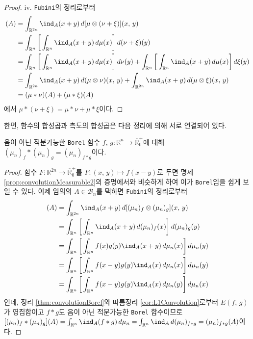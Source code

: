 \begin{proof}
    iv. \texttt{Fubini}의 정리로부터
    \begin{align*}
        [\mu*(\nu+\xi)](A)&=\int_{\mathbb{R}^{2n}}\ind_A(x+y)\,d[\mu\otimes(\nu+\xi)](x,\,y)\\
        &=\int_{\mathbb{R}^n}\bigg[\int_{\mathbb{R}^n}\ind_A(x+y)\,d\mu(x)\bigg]\,d(\nu+\xi)(y)\\
        &=\int_{\mathbb{R}^n}\bigg[\int_{\mathbb{R}^n}\ind_A(x+y)\,d\mu(x)\bigg]\,d\nu(y)+\int_{\mathbb{R}^n}\bigg[\int_{\mathbb{R}^n}\ind_A(x+y)\,d\mu(x)\bigg]\,d\xi(y)\\
        &=\int_{\mathbb{R}^{2n}}\ind_A(x+y)\,d(\mu\otimes\nu)(x,\,y)+\int_{\mathbb{R}^{2n}}\ind_A(x+y)\,d(\mu\otimes\xi)(x,\,y)\\
        &=(\mu*\nu)(A)+(\mu*\xi)(A)
    \end{align*}
    에서 $\mu*(\nu+\xi)=\mu*\nu+\mu*\xi$이다.
\end{proof}

한편, 함수의 합성곱과 측도의 합성곱은 다음 정리에 의해 서로 연결되어 있다.

\begin{theorem}
    음이 아닌 적분가능한 \texttt{Borel} 함수 $f,\,g:\mathbb{R}^n\to\overline{\mathbb{R}}^+_0$에 대해 $(\mu_n)_f*(\mu_n)_g=(\mu_n)_{f*g}$이다.
\end{theorem}

\begin{proof}
    함수 $F:\mathbb{R}^{2n}\to\overline{\mathbb{R}}^+_0$를 $F:(x,\,y)\mapsto f(x-y)$로 두면 명제 \ref{prop:convolutionMeasurable2}의 증명에서와 비슷하게 하여 이가 \texttt{Borel}임을 쉽게 보일 수 있다. 이제 임의의 $A\in\mathcal{B}_n$를 택하면 \texttt{Fubini}의 정리로부터
    \begin{align*}
        [(\mu_n)_f*(\mu_n)_g](A)&=\int_{\mathbb{R}^{2n}}\ind_A(x+y)\,d[(\mu_n)_f\otimes(\mu_n)_g](x,\,y)\\
        &=\int_{\mathbb{R}^n}\bigg[\int_{\mathbb{R}^n}\ind_A(x+y)\,d(\mu_n)_f(x)\bigg]\,d(\mu_n)_g(y)\\
        &=\int_{\mathbb{R}^n}\bigg[\int_{\mathbb{R}^n}f(x)g(y)\ind_A(x+y)\,d\mu_n(x)\bigg]\,d\mu_n(y)\\
        &=\int_{\mathbb{R}^n}\bigg[\int_{\mathbb{R}^n}f(x-y)g(y)\ind_A(x)\,d\mu_n(x)\bigg]\,d\mu_n(y)\\
        &=\int_{\mathbb{R}^n}\bigg[\int_{\mathbb{R}^n}f(x-y)g(y)\ind_A(x)\,d\mu_n(y)\bigg]\,d\mu_n(x)
    \end{align*}
    인데, 정리 \ref{thm:convolutionBorel}와 따름정리 \ref{cor:L1Convolution}로부터 $E(f,\,g)$가 영집합이고 $f*g$도 음이 아닌 적분가능한 \texttt{Borel} 함수이므로 $[(\mu_n)_f*(\mu_n)_g](A)=\int_{\mathbb{R}^n}\ind_A(f*g)\,d\mu_n=\int_{\mathbb{R}^n}\ind_A\,d(\mu_n)_{f*g}=(\mu_n)_{f*g}(A)$이다.
\end{proof}

